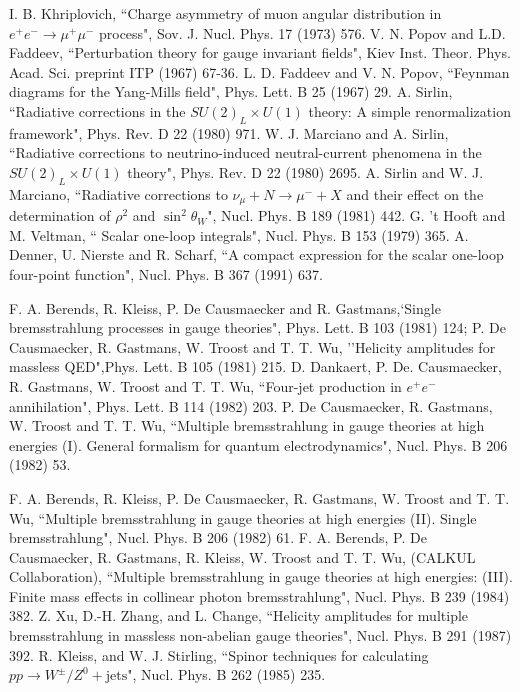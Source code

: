 \documentclass
[
]
{thesis}
\begin{document}
\begin{thebibliography}{widestlabel}
	 I. B. Khriplovich, ``Charge asymmetry of muon angular distribution in $e^+e^-\to\mu^+\mu^-$ process", Sov. J. Nucl. Phys. 17 (1973) 576.
	V. N. Popov and L.D. Faddeev, ``Perturbation theory for gauge invariant fields", Kiev Inst. Theor. Phys. Acad. Sci. preprint ITP (1967) 67-36. 
	 L. D. Faddeev and V. N. Popov, ``Feynman diagrams for the Yang-Mills field", Phys. Lett. B 25 (1967) 29.
	 A. Sirlin, ``Radiative corrections in the $SU(2)_L\times U(1)$ theory: A simple renormalization framework", Phys. Rev. D 22 (1980) 971.
	 W. J. Marciano and A. Sirlin, ``Radiative corrections to neutrino-induced neutral-current phenomena in the $SU(2)_L\times U(1)$ theory", Phys. Rev. D 22 (1980) 2695.
	 A. Sirlin and W. J. Marciano, ``Radiative corrections to $\nu_\mu+N\to\mu^-+X$  and their effect on the determination of $\rho^2$ and $\sin^2\theta_W$", Nucl. Phys. B 189 (1981) 442.
	 G. 't Hooft and M. Veltman, `` Scalar one-loop integrals", Nucl. Phys. B 153 (1979) 365.
	 A. Denner, U. Nierste and R. Scharf, ``A compact expression for the scalar one-loop four-point function", Nucl. Phys. B 367 (1991) 637.
	
	
	
	 F. A. Berends, R. Kleiss, P. De Causmaecker and R. Gastmans,`Single bremsstrahlung processes in gauge theories", Phys. Lett. B 103 (1981) 124;
	 P. De Causmaecker, R. Gastmans, W. Troost and T. T. Wu, ''Helicity amplitudes for massless QED",Phys. Lett. B 105 (1981) 215.
	 D. Dankaert, P. De. Causmaecker, R. Gastmans, W. Troost and T. T. Wu, ``Four-jet production in $e^+e^-$ annihilation", Phys. Lett. B 114 (1982) 203.
	 P. De Causmaecker, R. Gastmans, W. Troost and T. T. Wu, ``Multiple bremsstrahlung in gauge theories at high energies (I). General formalism for quantum electrodynamics", Nucl. Phys. B 206 (1982) 53.
	
	 F. A. Berends, R. Kleiss, P. De Causmaecker, R. Gastmans, W. Troost and T. T. Wu, ``Multiple bremsstrahlung in gauge theories at high energies (II). Single bremsstrahlung", Nucl. Phys. B 206 (1982) 61.
	 F. A. Berends, P. De Causmaecker, R. Gastmans,  R. Kleiss, W. Troost and T. T. Wu, (CALKUL Collaboration), ``Multiple bremsstrahlung in gauge theories at high energies: (III). Finite mass effects in collinear photon bremsstrahlung", Nucl. Phys. B 239 (1984) 382.
	 Z. Xu, D.-H. Zhang, and L. Change, ``Helicity amplitudes for multiple bremsstrahlung in massless non-abelian gauge theories", Nucl. Phys. B 291 (1987) 392.
	 R. Kleiss, and W. J. Stirling, ``Spinor techniques for calculating $pp\to W^\pm/Z^0+\text{jets}$", Nucl. Phys. B 262 (1985) 235.
	

\end{thebibliography}
\end{document}
